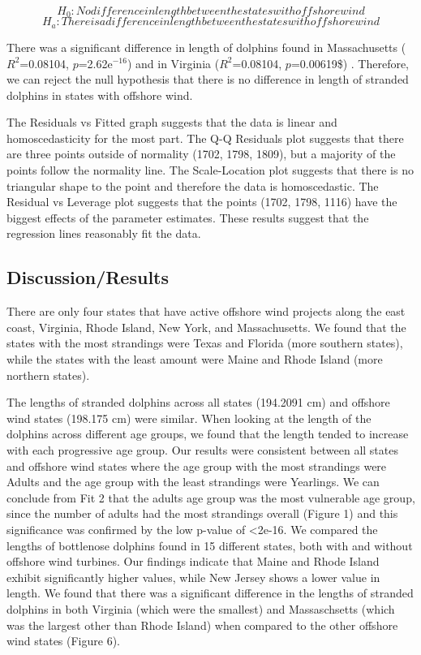 \documentclass[
]{article}
\begin{document}
\[H_0: No difference in length between the states with offshore wind \]
\[H_a: There is a difference in length between the states with offshore wind\]

There was a significant difference in length of dolphins found in
Massachusetts (\(R^2\)=0.08104, \(p\)=2.62e\(^{-16}\)) and in Virginia
(\(R^2\)=0.08104, \(p\)=0.00619\$) . Therefore, we can reject the null
hypothesis that there is no difference in length of stranded dolphins in
states with offshore wind.

The Residuals vs Fitted graph suggests that the data is linear and
homoscedasticity for the most part. The Q-Q Residuals plot suggests that
there are three points outside of normality (1702, 1798, 1809), but a
majority of the points follow the normality line. The Scale-Location
plot suggests that there is no triangular shape to the point and
therefore the data is homoscedastic. The Residual vs Leverage plot
suggests that the points (1702, 1798, 1116) have the biggest effects of
the parameter estimates. These results suggest that the regression lines
reasonably fit the data.

\hypertarget{discussionresults}{%
\subsection{Discussion/Results}\label{discussionresults}}

There are only four states that have active offshore wind projects along
the east coast, Virginia, Rhode Island, New York, and Massachusetts. We
found that the states with the most strandings were Texas and Florida
(more southern states), while the states with the least amount were
Maine and Rhode Island (more northern states).

The lengths of stranded dolphins across all states (194.2091 cm) and
offshore wind states (198.175 cm) were similar. When looking at the
length of the dolphins across different age groups, we found that the
length tended to increase with each progressive age group. Our results
were consistent between all states and offshore wind states where the
age group with the most strandings were Adults and the age group with
the least strandings were Yearlings. We can conclude from Fit 2 that the
adults age group was the most vulnerable age group, since the number of
adults had the most strandings overall (Figure 1) and this significance
was confirmed by the low p-value of \textless2e-16. We compared the
lengths of bottlenose dolphins found in 15 different states, both with
and without offshore wind turbines. Our findings indicate that Maine and
Rhode Island exhibit significantly higher values, while New Jersey shows
a lower value in length. We found that there was a significant
difference in the lengths of stranded dolphins in both Virginia (which
were the smallest) and Massaschsetts (which was the largest other than
Rhode Island) when compared to the other offshore wind states (Figure
6).
\end{document}
